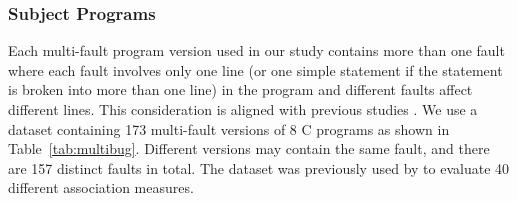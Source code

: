 %
%

\subsubsection{Subject Programs}\label{sec.exp.subject2}

Each multi-fault program version used in our study contains more than one fault where each fault involves only one line (or one simple statement if the statement is broken into more than one line) in the program and different faults affect different lines. This consideration is aligned with previous studies \citep[e.g.][]{zhang2013bridging,Abreu:2009.jss}. We use a dataset containing 173 multi-fault versions of 8 C programs as shown in Table~\ref{tab:multibug}. Different versions may contain the same fault, and there are 157 distinct faults in total. The dataset was previously used by \cite{lucia2013} to evaluate 40 different association measures.


